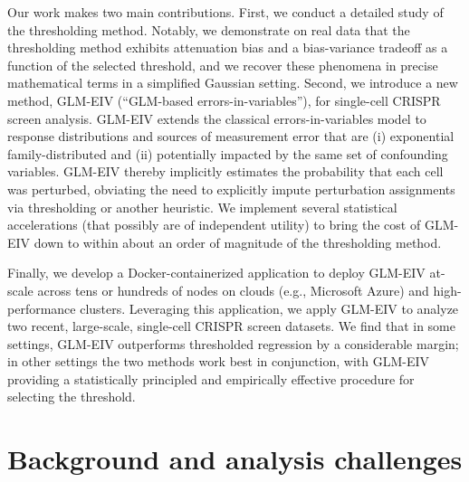 \documentclass[12pt]{article}
\begin{document}
Our work makes two main contributions. First, we conduct a detailed study of the thresholding method. Notably, we demonstrate on real data that the thresholding method exhibits attenuation bias and a bias-variance tradeoff as a function of the selected threshold, and we recover these phenomena in precise mathematical terms in a simplified Gaussian setting. Second, we introduce a new method, GLM-EIV (``GLM-based errors-in-variables''), for single-cell CRISPR screen analysis. GLM-EIV extends the classical errors-in-variables model to response distributions and sources of measurement error that are (i) exponential family-distributed and (ii) potentially impacted by the same set of confounding variables. GLM-EIV thereby implicitly estimates the probability that each cell was perturbed, obviating the need to explicitly impute perturbation assignments via thresholding or another heuristic. %
We implement several statistical accelerations (that possibly are of independent utility) to bring the cost of GLM-EIV down to within about an order of magnitude of the thresholding method.

Finally, we develop a Docker-containerized application to deploy GLM-EIV at-scale across tens or hundreds of nodes on clouds (e.g., Microsoft Azure) and high-performance clusters. Leveraging this application, we apply GLM-EIV to analyze two recent, large-scale, single-cell CRISPR screen datasets. We find that in some settings, GLM-EIV outperforms thresholded regression by a considerable margin; in other settings the two methods work best in conjunction, with GLM-EIV providing a statistically principled and empirically effective procedure for selecting the threshold.

\section{Background and analysis challenges}
\end{document}
